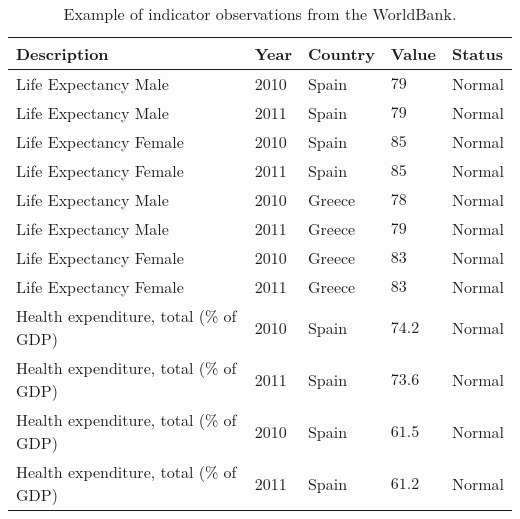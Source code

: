 \begin{table}[!htb]
\renewcommand{\arraystretch}{1.3}
\begin{center}
\begin{tabular}{|p{5.5cm}|p{1cm}|p{2cm}|p{1cm}|p{1.5cm}|}
\hline
  \textbf{Description} & \textbf{Year} & \textbf{Country} & \textbf{Value} & \textbf{Status} \\  \hline
  Life Expectancy Male & 2010 & Spain & $79$ & Normal \\ \hline
  Life Expectancy Male & 2011 & Spain & $79$ & Normal\\ \hline
  Life Expectancy Female & 2010 & Spain & $85$ & Normal\\ \hline
  Life Expectancy Female & 2011 & Spain & $85$ & Normal\\ \hline
  Life Expectancy Male & 2010 & Greece & $78$ & Normal\\ \hline
  Life Expectancy Male & 2011 & Greece & $79$ & Normal\\ \hline
  Life Expectancy Female & 2010 & Greece & $83$ & Normal\\ \hline
  Life Expectancy Female & 2011 & Greece & $83$ & Normal\\ \hline
  Health expenditure, total (\% of GDP) & 2010 & Spain & $74.2$ & Normal\\ \hline
  Health expenditure, total (\% of GDP) & 2011 & Spain & $73.6$ & Normal\\ \hline
  Health expenditure, total (\% of GDP) & 2010 & Spain & $61.5$ & Normal\\ \hline
  Health expenditure, total (\% of GDP) & 2011 & Spain & $61.2$ & Normal\\ \hline
  \hline
  \end{tabular}
  \caption{Example of indicator observations from the WorldBank.}
  \label{tab:example-wb}
  \end{center}	 
\end{table} 




	 	


